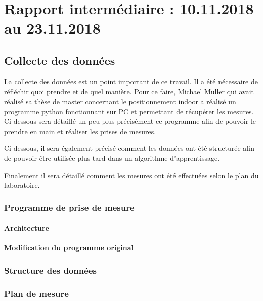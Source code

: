 \chapter{Rapport intermédiaire : 10.11.2018 au 23.11.2018}

\section{Collecte des données}
La collecte des données est un point important de ce travail. Il a été nécessaire de réfléchir quoi prendre et de quel manière. Pour ce faire, Michael Muller qui avait réalisé sa thèse de master concernant le positionnement indoor a réalisé un programme python fonctionnant sur PC et permettant de récupérer les mesures. Ci-dessous sera détaillé un peu plus précisément ce programme afin de pouvoir le prendre en main et réaliser les prises de mesures. 

Ci-dessous, il sera également précisé comment les données ont été structurée afin de pouvoir être utilisée plus tard dans un algorithme d'apprentissage. 

Finalement il sera détaillé comment les mesures ont été effectuées selon le plan du laboratoire.

\subsection{Programme de prise de mesure}
\subsubsection{Architecture}
\subsubsection{Modification du programme original}

\cite{MIC}

\subsection{Structure des données}

\subsection{Plan de mesure}



